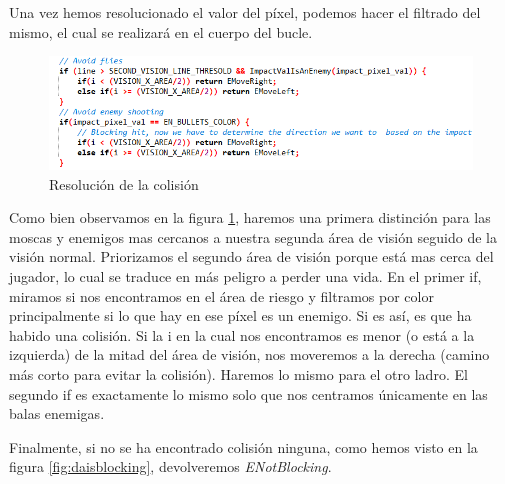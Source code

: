 Una vez hemos resolucionado el valor del píxel, podemos hacer el filtrado del mismo, el cual se realizará en el cuerpo del bucle.

\begin{figure}[h]
	\centering
	\includegraphics[width=1\textwidth]{Figures/cuerpobucleisblockingda}
	\caption{Resolución de la colisión}
	\label{fig:cuerpobucleisblockingda}
\end{figure}

Como bien observamos en la figura 	\ref{fig:cuerpobucleisblockingda}, haremos una primera distinción para las moscas y enemigos mas cercanos a nuestra segunda área de visión seguido de la visión normal. Priorizamos el segundo área de visión porque está mas cerca del jugador, lo cual se traduce en más peligro a perder una vida. En el primer if, miramos si nos encontramos en el área de riesgo y filtramos por color principalmente si lo que hay en ese píxel es un enemigo. Si es así, es que ha habido una colisión. Si la i en la cual nos encontramos es menor (o está a la izquierda) de la mitad del área de visión, nos moveremos a la derecha (camino más corto para evitar la colisión). Haremos lo mismo para el otro ladro. El segundo if es exactamente lo mismo solo que nos centramos únicamente en las balas enemigas.

Finalmente, si no se ha encontrado colisión ninguna, como hemos visto en la figura \ref{fig:daisblocking}, devolveremos \textit{ENotBlocking}.

